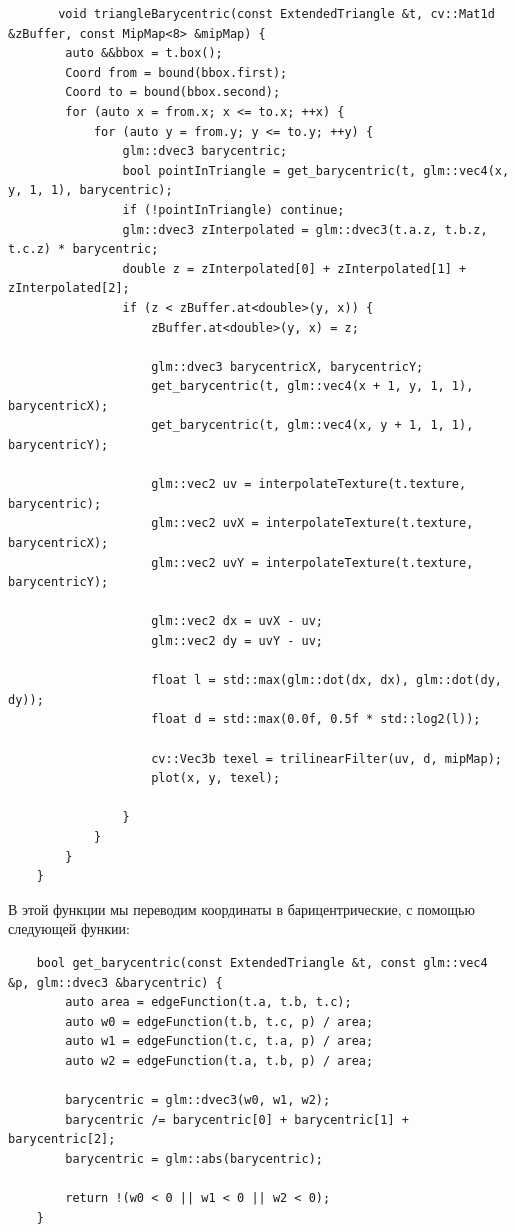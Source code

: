 \documentclass[14pt,a4paper,report]{report}
\begin{document}
   \begin{lstlisting}
       void triangleBarycentric(const ExtendedTriangle &t, cv::Mat1d &zBuffer, const MipMap<8> &mipMap) {
        auto &&bbox = t.box();
        Coord from = bound(bbox.first);
        Coord to = bound(bbox.second);
        for (auto x = from.x; x <= to.x; ++x) {
            for (auto y = from.y; y <= to.y; ++y) {
                glm::dvec3 barycentric;
                bool pointInTriangle = get_barycentric(t, glm::vec4(x, y, 1, 1), barycentric);
                if (!pointInTriangle) continue;
                glm::dvec3 zInterpolated = glm::dvec3(t.a.z, t.b.z, t.c.z) * barycentric;
                double z = zInterpolated[0] + zInterpolated[1] + zInterpolated[2];
                if (z < zBuffer.at<double>(y, x)) {
                    zBuffer.at<double>(y, x) = z;

                    glm::dvec3 barycentricX, barycentricY;
                    get_barycentric(t, glm::vec4(x + 1, y, 1, 1), barycentricX);
                    get_barycentric(t, glm::vec4(x, y + 1, 1, 1), barycentricY);

                    glm::vec2 uv = interpolateTexture(t.texture, barycentric);
                    glm::vec2 uvX = interpolateTexture(t.texture, barycentricX);
                    glm::vec2 uvY = interpolateTexture(t.texture, barycentricY);

                    glm::vec2 dx = uvX - uv;
                    glm::vec2 dy = uvY - uv;

                    float l = std::max(glm::dot(dx, dx), glm::dot(dy, dy));
                    float d = std::max(0.0f, 0.5f * std::log2(l));

                    cv::Vec3b texel = trilinearFilter(uv, d, mipMap);
                    plot(x, y, texel);

                }
            }
        }
    }
    \end{lstlisting}

В этой функции мы переводим координаты в барицентрические, с помощью следующей функии:
\begin{lstlisting}
    bool get_barycentric(const ExtendedTriangle &t, const glm::vec4 &p, glm::dvec3 &barycentric) {
        auto area = edgeFunction(t.a, t.b, t.c);
        auto w0 = edgeFunction(t.b, t.c, p) / area;
        auto w1 = edgeFunction(t.c, t.a, p) / area;
        auto w2 = edgeFunction(t.a, t.b, p) / area;

        barycentric = glm::dvec3(w0, w1, w2);
        barycentric /= barycentric[0] + barycentric[1] + barycentric[2];
        barycentric = glm::abs(barycentric);

        return !(w0 < 0 || w1 < 0 || w2 < 0);
    }
    \end{lstlisting}
    
\end{document}
